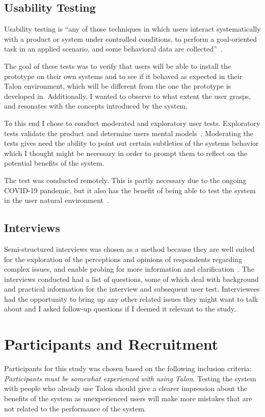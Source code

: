 \documentclass[../thesis.tex]{subfiles}
\begin{document}
\subsection{Usability Testing}
Usability testing is ``any of those
techniques in which users interact systematically with a product or system under
controlled conditions, to perform a goal-oriented task in an applied scenario, and
some behavioral data are collected''~\parencite{wichansky2000usability}.

The goal of these tests was to verify that users will be able to install the prototype
on their own systems and to see if it behaved as expected in their Talon environment, which will be different from
the one the prototype is developed in.
Additionally, I wanted to observe to what extent the user grasps, and resonates with the concepts introduced by the system.

To this end I chose to conduct moderated and exploratory user tests.
Exploratory tests validate the product and determine users mental models~\parencite{vasalou2004human}.
Moderating the tests gives need the ability to point out certain subtleties of the systems behavior
which I thought might be necessary in order to prompt them to reflect on the potential benefits of the system.

The test was conducted remotely.
This is partly necessary due to the ongoing COVID-19 pandemic, but it also has the
benefit of being able to test the system in the user natural environment~\parencite{vasalou2004human}.

\subsection{Interviews}
Semi-structured interviews was chosen as a method because they are  well  suited  for  the  exploration  of  the perceptions and opinions of  respondents regarding complex issues, and enable probing for more information and clarification~\parencite{louise1994collecting}.
The interviews conducted had a list of questions, some of which deal with background and practical information for the interview and subsequent user test.
Interviewees had the opportunity to bring up any other related issues they might want to talk about and I asked follow-up questions
if I deemed it relevant to the study.

\section{Participants and Recruitment}
Participants for this study was chosen based on the following inclusion criteria:
\textit{Participants must be somewhat experienced with using Talon}.
Testing the system with people who already use Talon should give a clearer impression
about the benefits of the system as unexperienced users will make more mistakes that are not 
related to the performance of the system.
\end{document}
